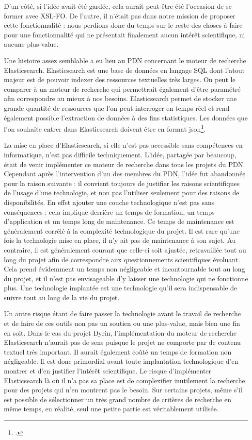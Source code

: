 \documentclass[a4paper,12pt,twoside]{book}
\begin{document}
D'un côté, si l'idée avait été gardée, cela aurait peut-être été l'occasion de se former avec \acrshort{XSL-FO}. De l'autre, il n'était pas dans notre mission de proposer cette fonctionnalité : nous perdions donc du temps sur le reste des choses à faire pour une fonctionnalité qui ne présentait finalement aucun intérêt scientifique, ni aucune plus-value.

Une histoire assez semblable a eu lieu au \acrshort{PDN} concernant le moteur de recherche Elasticsearch. Elasticsearch est une base de données en langage SQL dont l'atout majeur est de pouvoir indexer des ressources textuelles très larges. On peut le comparer à un moteur de recherche qui permettrait également d'être paramétré afin correspondre au mieux à nos besoins. Elasticsearch permet de stocker une grande quantité de ressources que l'on peut interroger en temps réel et rend également possible l'extraction de données à des fins statistiques. Les données que l'on souhaite entrer dans Elasticsearch doivent être en format json\footcite{elastic}. 

La mise en place d'Elasticsearch, si elle n'est pas accessible sans compétences en informatique, n'est pas difficile techniquement. L'idée, partagée par beaucoup, était de venir implémenter ce moteur de recherche dans tous les projets du \acrshort{PDN}. Cependant après l'intervention d'un des membres du \acrshort{PDN}, l'idée fut abandonnée pour la raison suivante : il convient toujours de justifier les raisons scientifiques de l'usage d'une technologie, et non pas l'utiliser seulement pour des raisons de disponibilités. En effet ajouter une couche technologique n'est pas sans conséquences : cela implique derrière un temps de formation, un temps d'application et un temps long de maintenance. Ce temps de maintenance est généralement corrélé à la complexité technologique du projet. Il est rare qu'une fois la technologie mise en place, il n'y ait pas de maintenance à son sujet. Au contraire, il est généralement courant que celle-ci soit ajustée, retravaillée tout au long du projet afin de correspondre aux questionnements scientifiques évoluant. Cela prend évidemment un temps non négligeable et incontournable tout au long du projet, et il n'est pas envisageable d'y laisser une technologie qui ne fonctionne plus. Une technologie implantée est une technologie qu'il sera indispensable de suivre tout au long de la vie du projet. 

Un autre risque étant de faire passer la technologie avant le travail de recherche et de faire de ces outils non pas un soutien ou une plus-value, mais bien une fin en soit. Dans le cas du projet Dyrin, l'implémentation du moteur de recherche Elasticsearch n'aurait pas de sens puisque le projet ne comporte par de contenu textuel très important. Il aurait également coûté un temps de formation non négligeable. Il est donc primordial avant toute implantation technologique d'en montrer et d'en justifier l'intérêt scientifique. Le risque d'implémenter Elasticsearch là où il n'a pas sa place est de complexifier inutilement la recherche pour des projets qui n'en montrent pas le besoin. Sur certains projets, même s'il est possible de sélectionner un très grand nombre de critères de recherche en même temps, en réalité, seul une petite partie est véritablement utilisée. 
\end{document}
